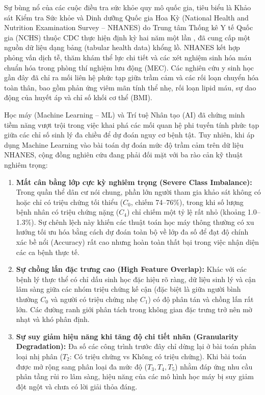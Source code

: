 Sự bùng nổ của các cuộc điều tra sức khỏe quy mô quốc gia, tiêu biểu là Khảo sát Kiểm tra Sức khỏe và Dinh dưỡng Quốc gia Hoa Kỳ (National Health and Nutrition Examination Survey -- NHANES) do Trung tâm Thống kê Y tế Quốc gia (NCHS) thuộc CDC thực hiện định kỳ hai năm một lần \cite{cdc2014nhanes, cdc2016nhanes}, đã cung cấp một nguồn dữ liệu dạng bảng (tabular health data) khổng lồ. NHANES kết hợp phỏng vấn dịch tễ, thăm khám thể lực chi tiết và các xét nghiệm sinh hóa máu chuẩn hóa trong phòng thí nghiệm lưu động (MEC). Các nghiên cứu y sinh học gần đây đã chỉ ra mối liên hệ phức tạp giữa trầm cảm và các rối loạn chuyển hóa toàn thân, bao gồm phản ứng viêm mãn tính thể nhẹ, rối loạn lipid máu, sự dao động của huyết áp và chỉ số khối cơ thể (BMI).

Học máy (Machine Learning -- ML) và Trí tuệ Nhân tạo (AI) đã chứng minh tiềm năng vượt trội trong việc khai phá các mối quan hệ phi tuyến tính phức tạp giữa các chỉ số sinh lý đa chiều để dự đoán nguy cơ bệnh tật. Tuy nhiên, khi áp dụng Machine Learning vào bài toán dự đoán mức độ trầm cảm trên dữ liệu NHANES, cộng đồng nghiên cứu đang phải đối mặt với ba rào cản kỹ thuật nghiêm trọng:
\begin{enumerate}
    \item \textbf{Mất cân bằng lớp cực kỳ nghiêm trọng (Severe Class Imbalance):} Trong quần thể dân cư nói chung, phần lớn người tham gia khảo sát không có hoặc chỉ có triệu chứng tối thiểu ($C_0$, chiếm 74--76\%), trong khi số lượng bệnh nhân có triệu chứng nặng ($C_4$) chỉ chiếm một tỷ lệ rất nhỏ (khoảng 1.0--1.3\%). Sự chênh lệch này khiến các thuật toán học máy thông thường có xu hướng tối ưu hóa bằng cách dự đoán toàn bộ về lớp đa số để đạt độ chính xác bề nổi (Accuracy) rất cao nhưng hoàn toàn thất bại trong việc nhận diện các ca bệnh thực tế.
    \item \textbf{Sự chồng lấn đặc trưng cao (High Feature Overlap):} Khác với các bệnh lý thực thể có chỉ dấu sinh học đặc hiệu rõ ràng, dữ liệu sinh lý và cận lâm sàng giữa các nhóm triệu chứng kế cận (đặc biệt là giữa người bình thường $C_0$ và người có triệu chứng nhẹ $C_1$) có độ phân tán và chồng lấn rất lớn. Các đường ranh giới phân tách trong không gian đặc trưng trở nên mờ nhạt và khó phân định.
    \item \textbf{Sự suy giảm hiệu năng khi tăng độ chi tiết nhãn (Granularity Degradation):} Đa số các công trình trước đây chỉ dừng lại ở bài toán phân loại nhị phân ($T_2$: Có triệu chứng vs Không có triệu chứng). Khi bài toán được mở rộng sang phân loại đa mức độ ($T_3, T_4, T_5$) nhằm đáp ứng nhu cầu phân tầng rủi ro lâm sàng, hiệu năng của các mô hình học máy bị suy giảm đột ngột và chưa có lời giải thỏa đáng.
\end{enumerate}

